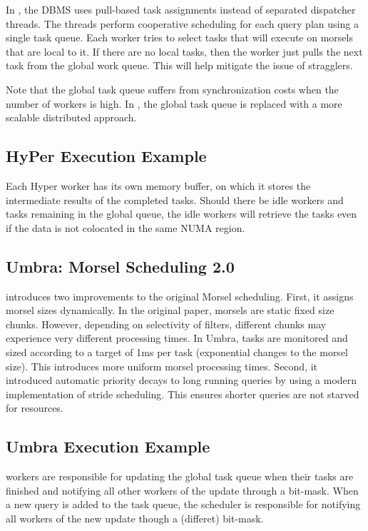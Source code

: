 \documentclass[11pt]{article}
\begin{document}
In , the DBMS uses pull-based task assignments instead of separated dispatcher 
threads. The threads perform cooperative scheduling for each query plan using a single task queue. 
Each worker tries to select tasks that will execute on morsels that are local to it. If there are 
no local tasks, then the worker just pulls the next task from the global work queue. This will help 
mitigate the issue of stragglers. 

Note that the global task queue suffers from synchronization costs when the number of workers is high. 
In , the global task queue is replaced with a more scalable distributed approach. 

\subsection*{HyPer Execution Example}
Each Hyper worker has its own memory buffer, on which it stores the intermediate results of the completed 
tasks. Should there be idle workers and tasks remaining in the global queue, the idle workers will retrieve 
the tasks even if the data is not colocated in the same NUMA region. 


\subsection*{Umbra: Morsel Scheduling 2.0}
 introduces two improvements to the original Morsel scheduling. First, it assigns morsel 
sizes dynamically. In the original paper, morsels are static fixed size chunks. However, depending on selectivity 
of filters, different chunks may experience very different processing times. In Umbra, tasks are monitored 
and sized according to a target of 1ms per task (exponential changes to the morsel size). This introduces more 
uniform morsel processing times. Second, it introduced automatic priority decays to long running queries by 
using a modern implementation of stride scheduling. This ensures shorter queries are not starved for 
resources.

\subsection*{Umbra Execution Example}
 workers are responsible for updating the global task queue when their tasks are finished 
and notifying all other workers of the update through a bit-mask. When a new query is added to 
the task queue, the scheduler is responsible for notifying all workers of the new update though a (differet) 
bit-mask.
\end{document}
